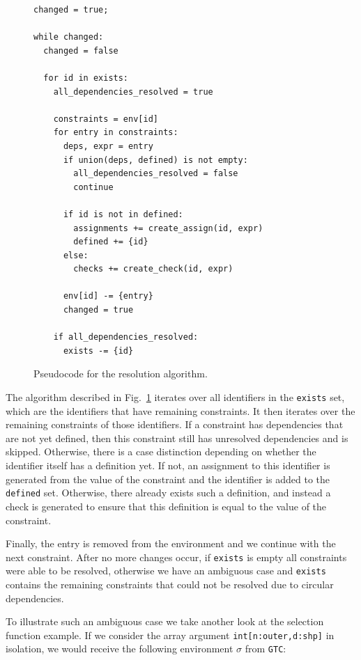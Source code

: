 \documentclass[sigconf,screen]{acmart}
\newcommand{\cenv}{\ensuremath{\sigma{}}}
\begin{document}
\begin{figure}[!ht]
\begin{lstlisting}[language=pseudocode]
changed = true;

while changed:
  changed = false

  for id in exists:
    all_dependencies_resolved = true

    constraints = env[id]
    for entry in constraints:
      deps, expr = entry
      if union(deps, defined) is not empty:
        all_dependencies_resolved = false
        continue

      if id is not in defined:
        assignments += create_assign(id, expr)
        defined += {id}
      else:
        checks += create_check(id, expr)

      env[id] -= {entry}
      changed = true

    if all_dependencies_resolved:
      exists -= {id}
\end{lstlisting}
\caption{Pseudocode for the resolution algorithm.}
\label{fig:resolution-algorithm}
\end{figure}

The algorithm described in Fig.~\ref{fig:resolution-algorithm} iterates over all identifiers in the \texttt{exists} set, which are the identifiers that have remaining constraints.
It then iterates over the remaining constraints of those identifiers.
If a constraint has dependencies that are not yet defined, then this constraint still has unresolved dependencies and is skipped.
Otherwise, there is a case distinction depending on whether the identifier itself has a definition yet.
If not, an assignment to this identifier is generated from the value of the constraint and the identifier is added to the \texttt{defined} set.
Otherwise, there already exists such a definition, and instead a check is generated to ensure that this definition is equal to the value of the constraint.

Finally, the entry is removed from the environment and we continue with the next constraint.
After no more changes occur, if \texttt{exists} is empty all constraints were able to be resolved, otherwise we have an ambiguous case and \texttt{exists} contains the remaining constraints that could not be resolved due to circular dependencies.

To illustrate such an ambiguous case we take another look at the selection function example.
If we consider the array argument \texttt{int[n:outer,d:shp]} in isolation, we would receive the following environment \cenv{} from \texttt{GTC}:
\end{document}
